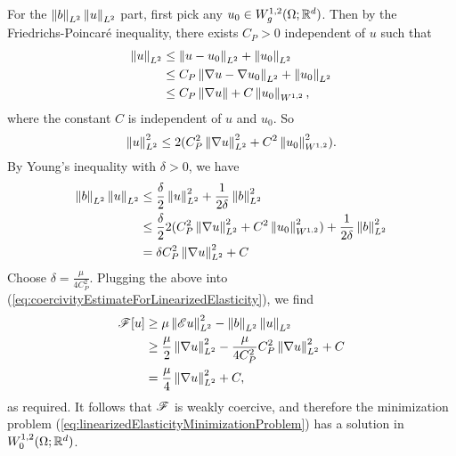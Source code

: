 \begin{example}
    For the $\left\lVert {b} \right\rVert_{L^2} \left\lVert {u} \right\rVert_{L^2}$ part, first pick any $u_0 \in W_g^{1,2}(\Omega;\mathbb{R}^d)$. Then by the Friedrichs-Poincar\'e inequality, there exists $C_P > 0$ independent of $u$ such that 
    \begin{equation} \begin{aligned}
        \left\lVert {u} \right\rVert_{L^2} &\leq \left\lVert {u - u_0} \right\rVert_{L^2} + \left\lVert {u_0} \right\rVert_{L^2} \\
                       &\leq C_P \left\lVert {\nabla u - \nabla u_0} \right\rVert_{L^2} + \left\lVert {u_0} \right\rVert_{L^2} \\
                       &\leq C_P \left\lVert {\nabla u} \right\rVert + C \left\lVert {u_0} \right\rVert_{W^{1,2}},
    \end{aligned} \end{equation}
    where the constant $C$ is independent of $u$ and $u_0$. So 
    \begin{equation}
        \left\lVert {u} \right\rVert_{L^2}^2 \leq 2(C_P^2 \left\lVert {\nabla u} \right\rVert_{L^2}^2 + C^2 \left\lVert {u_0} \right\rVert_{W^{1,2}}^2).
    \end{equation}
    By Young's inequality with $\delta > 0$, we have 
    \begin{equation} \begin{aligned}
        \left\lVert {b} \right\rVert_{L^2} \left\lVert {u} \right\rVert_{L^2} &\leq \frac{\delta}{2} \left\lVert {u} \right\rVert_{L^2}^2 + \frac{1}{2\delta} \left\lVert {b} \right\rVert_{L^2}^2 \\
                                      &\leq \frac{\delta}{2} 2(C_P^2 \left\lVert {\nabla u} \right\rVert_{L^2}^2 + C^2 \left\lVert {u_0} \right\rVert_{W^{1,2}}^2) + \frac{1}{2\delta} \left\lVert {b} \right\rVert_{L^2}^2 \\
                                      &= \delta C_P^2 \left\lVert {\nabla u} \right\rVert_{L^2}^2 + C
    \end{aligned} \end{equation}
    Choose $\delta = \frac{\mu}{4C_P^2}$. Plugging the above into (\ref{eq:coercivityEstimateForLinearizedElasticity}), we find 
    \begin{equation} \begin{aligned}
        \mathscr{F}[u] &\geq \mu \left\lVert { \mathscr{E}u } \right\rVert_{L^2}^2 - \left\lVert {b} \right\rVert_{L^2} \left\lVert {u} \right\rVert_{L^2} \\
                 &\geq \frac{\mu}{2} \left\lVert {\nabla u} \right\rVert_{L^2}^2  - \frac{\mu}{4C_P^2} C_P^2 \left\lVert {\nabla u} \right\rVert_{L^2}^2 + C \\ 
                 &= \frac{\mu}{4} \left\lVert {\nabla u} \right\rVert_{L^2}^2 + C,
    \end{aligned} \end{equation}
    as required. It follows that $\mathscr{F}$ is weakly coercive, and therefore the minimization problem (\ref{eq:linearizedElasticityMinimizationProblem}) has a solution in $W_0^{1,2}(\Omega;\mathbb{R}^d)$.
\end{example}

